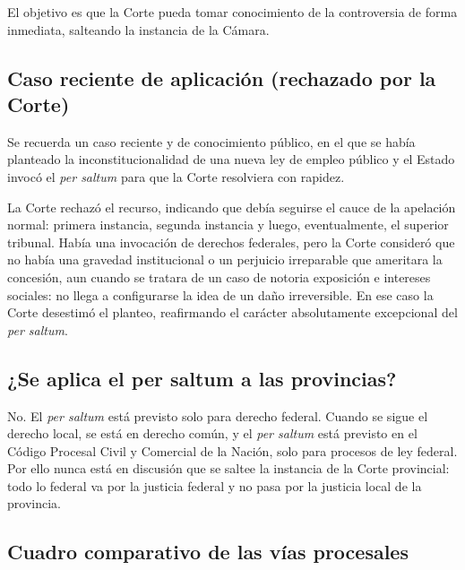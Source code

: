 \documentclass[12pt,oneside]{book}
\begin{document}
El objetivo es que la Corte pueda tomar conocimiento de la controversia de forma inmediata, salteando la instancia de la Cámara.

\subsection{Caso reciente de aplicación (rechazado por la Corte)}

Se recuerda un caso reciente y de conocimiento público, en el que se había planteado la inconstitucionalidad de una nueva ley de empleo público y el Estado invocó el \textit{per saltum} para que la Corte resolviera con rapidez.

La Corte rechazó el recurso, indicando que debía seguirse el cauce de la apelación normal: primera instancia, segunda instancia y luego, eventualmente, el superior tribunal. Había una invocación de derechos federales, pero la Corte consideró que no había una gravedad institucional o un perjuicio irreparable que ameritara la concesión, aun cuando se tratara de un caso de notoria exposición e intereses sociales: no llega a configurarse la idea de un daño irreversible. En ese caso la Corte desestimó el planteo, reafirmando el carácter absolutamente excepcional del \textit{per saltum}.

\subsection{¿Se aplica el per saltum a las provincias?}

No. El \textit{per saltum} está previsto solo para derecho federal. Cuando se sigue el derecho local, se está en derecho común, y el \textit{per saltum} está previsto en el Código Procesal Civil y Comercial de la Nación, solo para procesos de ley federal. Por ello nunca está en discusión que se saltee la instancia de la Corte provincial: todo lo federal va por la justicia federal y no pasa por la justicia local de la provincia.

\subsection{Cuadro comparativo de las vías procesales}
\end{document}
